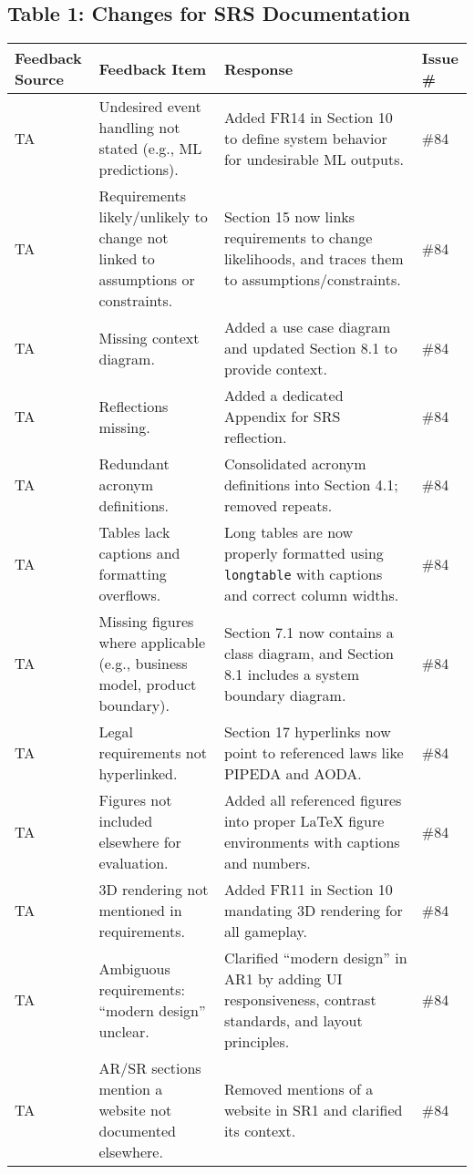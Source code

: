 \documentclass{article}
\begin{document}
\subsection*{Table 1: Changes for SRS Documentation}
\begin{longtable}{|p{2cm}|p{5cm}|p{5cm}|p{2cm}|}
\hline
\textbf{Feedback Source} & \textbf{Feedback Item} & \textbf{Response} & \textbf{Issue \#} \\
\hline
TA & Undesired event handling not stated (e.g., ML predictions). & Added FR14 in Section 10 to define system behavior for undesirable ML outputs. & \#84 \\
\hline
TA & Requirements likely/unlikely to change not linked to assumptions or constraints. & Section 15 now links requirements to change likelihoods, and traces them to assumptions/constraints. & \#84 \\
\hline
TA & Missing context diagram. & Added a use case diagram and updated Section 8.1 to provide context. & \#84 \\
\hline
TA & Reflections missing. & Added a dedicated Appendix for SRS reflection. & \#84 \\
\hline
TA & Redundant acronym definitions. & Consolidated acronym definitions into Section 4.1; removed repeats. & \#84 \\
\hline
TA & Tables lack captions and formatting overflows. & Long tables are now properly formatted using \texttt{longtable} with captions and correct column widths. & \#84 \\
\hline
TA & Missing figures where applicable (e.g., business model, product boundary). & Section 7.1 now contains a class diagram, and Section 8.1 includes a system boundary diagram. & \#84 \\
\hline
TA & Legal requirements not hyperlinked. & Section 17 hyperlinks now point to referenced laws like PIPEDA and AODA. & \#84 \\
\hline
TA & Figures not included elsewhere for evaluation. & Added all referenced figures into proper LaTeX figure environments with captions and numbers. & \#84 \\
\hline
TA & 3D rendering not mentioned in requirements. & Added FR11 in Section 10 mandating 3D rendering for all gameplay. & \#84 \\
\hline
TA & Ambiguous requirements: “modern design” unclear. & Clarified “modern design” in AR1 by adding UI responsiveness, contrast standards, and layout principles. & \#84 \\
\hline
TA & AR/SR sections mention a website not documented elsewhere. & Removed mentions of a website in SR1 and clarified its context. & \#84 \\

\end{longtable}
\end{document}
